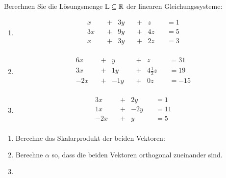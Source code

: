 	\newcommand{\lgslinethree}[4]{#1 x\quad &+&  #2 y\quad &+&  #3 z\quad & = #4 \\}
	\newcommand{\lgslinetwo}[3]{#1 x\quad &+&  #2 y\quad & = #3 \\}
	Berechnen Sie die Lösungsmenge $\mathbb{L}\subseteq\mathbb{R}$ der linearen Gleichungssysteme:
	\begin{multicols}{2}
		\begin{enumerate}
			\item
			\begin{alignat*}{5}
				\lgslinethree{}{3}{}{1}
				\lgslinethree{3}{9}{4}{5}
				\lgslinethree{}{3}{2}{3}
			\end{alignat*}
			\item
			\begin{alignat*}{4}
				\lgslinethree{6}{}{}{31}
				\lgslinethree{3}{1}{4\frac 1 2}{19}
				\lgslinethree{-2}{-1}{0}{-15}
			\end{alignat*}
			\item
			\begin{alignat*}{4}
				\lgslinetwo{3}{2}{1}
				\lgslinetwo{1}{-2}{11}
				\lgslinetwo{-2}{}{5}
			\end{alignat*}
		\end{enumerate}
	\end{multicols}



	\begin{enumerate}
		\item Berechne das Skalarprodukt der beiden Vektoren:
		\item Berechne $\alpha$ so, dass die beiden Vektoren orthogonal zueinander sind.
		\item
	\end{enumerate}



